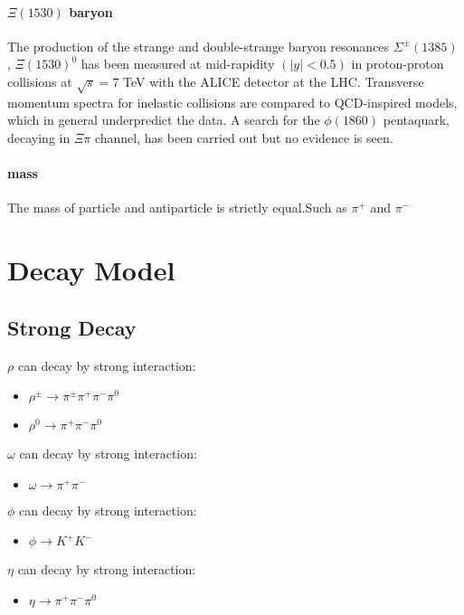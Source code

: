 \documentclass[
10pt, %
a4paper, %
oneside, %
headinclude,footinclude, %
BCOR5mm, %
]{scrartcl}
\begin{document}
\paragraph{$\Xi(1530)$ baryon} The production of the strange and double-strange baryon resonances $\Sigma^{\pm}(1385)$ , $\Xi(1530)^0$ has been measured at mid-rapidity $(|y|< 0.5)$ in proton-proton collisions at $\sqrt{s} = 7$ TeV with the ALICE detector at the LHC. Transverse momentum spectra for inelastic collisions are compared to QCD-inspired models, which in general underpredict the data. A search for the $\phi(1860)$ pentaquark, decaying in $\Xi\pi$ channel, has been carried out but no evidence is seen.\cite{Abelev:1709031}

\paragraph{mass}The mass of particle and antiparticle is strictly equal.Such as $\pi^+$ and $\pi^-$
\section{Decay Model}

\subsection{Strong Decay}
$\rho$ can decay by strong interaction:
\begin{itemize}
\item $\rho^{\pm}\rightarrow\pi^{\pm}\pi^+\pi^-\pi^0$
\item $\rho^0\rightarrow\pi^+\pi^-\pi^0$
\end{itemize}

$\omega$ can decay by strong interaction:
\begin{itemize}
\item $\omega\rightarrow\pi^+\pi^-$
\end{itemize}

$\phi$ can decay by strong interaction:
\begin{itemize}
\item $\phi\rightarrow K^+K^-$
\end{itemize}

$\eta$ can decay by strong interaction:
\begin{itemize}
\item $\eta\rightarrow\pi^+\pi^-\pi^0$
\end{itemize}
\end{document}
